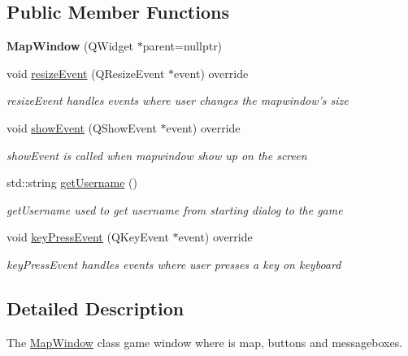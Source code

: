 \subsection*{Public Member Functions}
\begin{DoxyCompactItemize}
\item 
\hypertarget{class_game_1_1_map_window_aada219bb81fc36f618ce6c6db562e21f}{{\bfseries Map\-Window} (Q\-Widget $\ast$parent=nullptr)}\label{class_game_1_1_map_window_aada219bb81fc36f618ce6c6db562e21f}

\item 
void \hyperlink{class_game_1_1_map_window_adba5d7b1e410b80248431586d7e06787}{resize\-Event} (Q\-Resize\-Event $\ast$event) override
\begin{DoxyCompactList}\small\item\em resize\-Event handles events where user changes the mapwindow's size \end{DoxyCompactList}\item 
void \hyperlink{class_game_1_1_map_window_a3ad805cd0011042bae64f7c0680dee75}{show\-Event} (Q\-Show\-Event $\ast$event) override
\begin{DoxyCompactList}\small\item\em show\-Event is called when mapwindow show up on the screen \end{DoxyCompactList}\item 
std\-::string \hyperlink{class_game_1_1_map_window_abddb4e34e8944de58ea55dd263a216e8}{get\-Username} ()
\begin{DoxyCompactList}\small\item\em get\-Username used to get username from starting dialog to the game \end{DoxyCompactList}\item 
void \hyperlink{class_game_1_1_map_window_acf9cb2d5196093123ddbddc77b2e8da8}{key\-Press\-Event} (Q\-Key\-Event $\ast$event) override
\begin{DoxyCompactList}\small\item\em key\-Press\-Event handles events where user presses a key on keyboard \end{DoxyCompactList}\end{DoxyCompactItemize}


\subsection{Detailed Description}
The \hyperlink{class_game_1_1_map_window}{Map\-Window} class game window where is map, buttons and messageboxes. 

